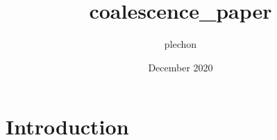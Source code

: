 \documentclass{article}
\title{coalescence_paper}
\author{plechon }
\date{December 2020}
\begin{document}
\maketitle

\section{Introduction}
\end{document}
